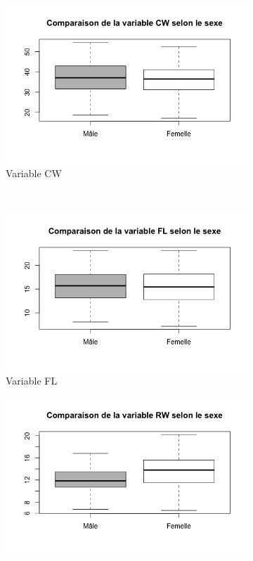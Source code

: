 \documentclass[a4paper,10pt]{report}
\begin{document}
\begin{figure}[H]
\begin{subfigure}[b]{0.3\linewidth}
		\includegraphics[width=1\linewidth]{img/1-2-1-sex-cw.png}
		\caption{\scriptsize Variable CW}
		\label{fig:1_2_1_sex_cw}
	\end{subfigure}%
	\\
	\begin{subfigure}[b]{0.3\linewidth}
		\centering
		\captionsetup{justification=centering, margin=1cm}
		\includegraphics[width=1\linewidth]{img/1-2-1-sex-fl.png}
		\caption{\scriptsize Variable FL}
		\label{fig:1_2_1_sex_fl}
	\end{subfigure}%
	\begin{subfigure}[b]{0.3\linewidth}
		\centering
		\captionsetup{justification=centering, margin=1cm}
		\includegraphics[width=1\linewidth]{img/1-2-1-sex-rw.png}

\end{subfigure}
\end{figure}
\end{document}
